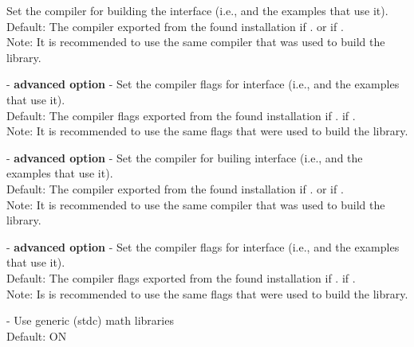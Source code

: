 \begin{description}
  Set the {\CC} compiler for building the {\trilinos} interface
  (i.e., {\nvectrilinos} and the examples that use it).
  \\
  Default: The {\CC} compiler exported from the found {\trilinos} installation
  if .  or  if .
  \\
  Note: It is recommended to use the same compiler that was used to build the {\trilinos} library.
\item[\id{TRILINOS\_INTERFACE\_C\_COMPILER\_FLAGS}] - \textbf{advanced option} -
  Set the {\CC} compiler flags for {\trilinos} interface
  (i.e., {\nvectrilinos} and the examples that use it).
  \\
  Default: The {\CC} compiler flags exported from the found {\trilinos} installation
  if .  if .
  \\
  Note: It is recommended to use the same flags that were used to build the {\trilinos} library.
\item[\id{TRILINOS\_INTERFACE\_CXX\_COMPILER}] - \textbf{advanced option} -
  Set the {\CPP} compiler for builing {\trilinos} interface
  (i.e., {\nvectrilinos} and the examples that use it).
  \\
  Default: The {\CPP} compiler exported from the found {\trilinos} installation
  if .  or  if .
  \\
  Note: It is recommended to use the same compiler that was used to build the {\trilinos} library.
\item[\id{TRILINOS\_INTERFACE\_CXX\_COMPILER\_FLAGS}] - \textbf{advanced option} -
  Set the {\CPP} compiler flags for {\trilinos} interface
  (i.e., {\nvectrilinos} and the examples that use it).
  \\
  Default: The {\CPP} compiler flags exported from the found {\trilinos} installation
  if .  if .
  \\
  Note: Is is recommended to use the same flags that were used to build the {\trilinos} library.
\item[\id{USE\_GENERIC\_MATH}] -
  Use generic (stdc) math libraries
  \\
  Default: ON



\end{description}

